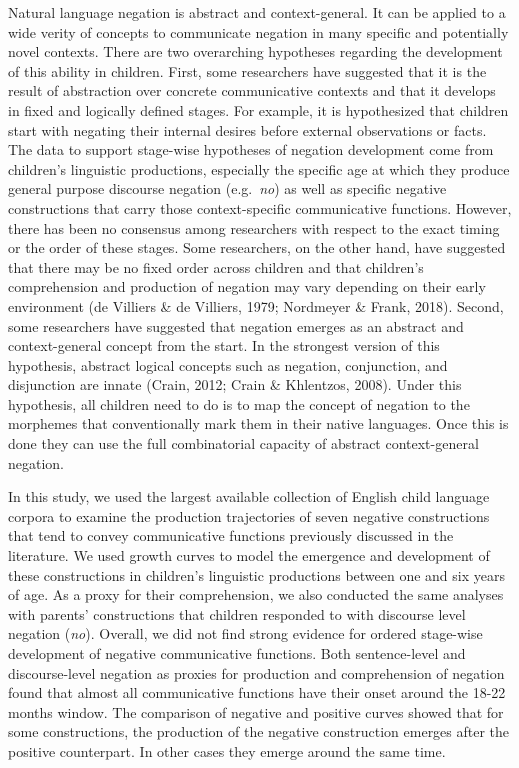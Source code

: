 \documentclass[
  man,floatsintext]{apa6}
\begin{document}
Natural language negation is abstract and context-general. It can be applied to a wide verity of concepts to communicate negation in many specific and potentially novel contexts. There are two overarching hypotheses regarding the development of this ability in children. First, some researchers have suggested that it is the result of abstraction over concrete communicative contexts and that it develops in fixed and logically defined stages. For example, it is hypothesized that children start with negating their internal desires before external observations or facts. The data to support stage-wise hypotheses of negation development come from children's linguistic productions, especially the specific age at which they produce general purpose discourse negation (e.g.~\emph{no}) as well as specific negative constructions that carry those context-specific communicative functions. However, there has been no consensus among researchers with respect to the exact timing or the order of these stages. Some researchers, on the other hand, have suggested that there may be no fixed order across children and that children's comprehension and production of negation may vary depending on their early environment (de Villiers \& de Villiers, 1979; Nordmeyer \& Frank, 2018). Second, some researchers have suggested that negation emerges as an abstract and context-general concept from the start. In the strongest version of this hypothesis, abstract logical concepts such as negation, conjunction, and disjunction are innate (Crain, 2012; Crain \& Khlentzos, 2008). Under this hypothesis, all children need to do is to map the concept of negation to the morphemes that conventionally mark them in their native languages. Once this is done they can use the full combinatorial capacity of abstract context-general negation.

In this study, we used the largest available collection of English child language corpora to examine the production trajectories of seven negative constructions that tend to convey communicative functions previously discussed in the literature. We used growth curves to model the emergence and development of these constructions in children's linguistic productions between one and six years of age. As a proxy for their comprehension, we also conducted the same analyses with parents' constructions that children responded to with discourse level negation (\emph{no}). Overall, we did not find strong evidence for ordered stage-wise development of negative communicative functions. Both sentence-level and discourse-level negation as proxies for production and comprehension of negation found that almost all communicative functions have their onset around the 18-22 months window. The comparison of negative and positive curves showed that for some constructions, the production of the negative construction emerges after the positive counterpart. In other cases they emerge around the same time.
\end{document}

